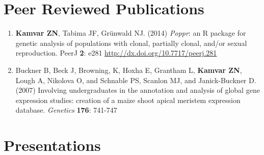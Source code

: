 \documentclass[10pt,letterpaper,sans]{modernresume} %
\begin{document}
\section{Peer Reviewed Publications}

\begin{enumerate}

    \item \textbf{Kamvar ZN}, Tabima JF, Gr\"unwald NJ. (2014) \textit{Poppr}: an
	R package for genetic analysis of populations with clonal, partially clonal,
	and/or sexual reproduction. PeerJ \textbf{2}: e281
	\url{http://dx.doi.org/10.7717/peerj.281}

	\item Buckner B, Beck J, Browning, K, Hoxha E, Grantham L, \textbf{Kamvar ZN}, Lough A,
	Nikolova O, and Schnable PS, Scanlon MJ, and Janick-Buckner D. (2007) Involving
	undergraduates in the annotation and analysis of global gene expression studies:
	creation of a maize shoot apical meristem expression database. \textit{Genetics}
	\textbf{176}: 741-747

\end{enumerate}



\section{Presentations}
\end{document}
